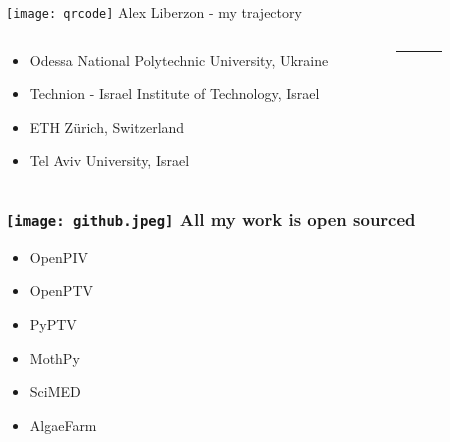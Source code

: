 

% 

%

\begin{frame}[label=intro-1]{\texttt{[image: qrcode]} Alex Liberzon - my trajectory }

\begin{columns}
\begin{column}{.78\textwidth}
\begin{card}
\begin{itemize}
\item Odessa National Polytechnic University, Ukraine
\item Technion - Israel Institute of Technology, Israel
\item ETH Z\"{u}rich, Switzerland
\item Tel Aviv University, Israel
\end{itemize}
\end{card}
\end{column}

    \begin{column}{.02\textwidth}
        \rule{.1mm}{0.7\textheight}
    \end{column}
    
\begin{column}{.2\textwidth}
\end{column}
\end{columns}
\end{frame}
%
\begin{frame}[label=intro-2]
\frametitle{\texttt{[image: github.jpeg]} All my work is open sourced  }
\begin{multicols}{2}
\begin{card}
\begin{itemize}
\item OpenPIV
\item OpenPTV
\item PyPTV
\item MothPy
\item SciMED
\item AlgaeFarm
\end{itemize}
\end{card}
\end{multicols}
\end{frame}

